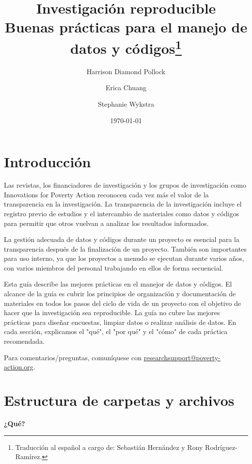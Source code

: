 \documentclass[11pt,en]{elegantpaper}
\title{Investigación reproducible \\ Buenas prácticas para el manejo de datos y códigos\footnote{Traducción al español a cargo de: Sebastián Hernández y Rony Rodríguez-Ramírez.}}
\author{Harrison Diamond Pollock \and Erica Chuang \and Stephanie Wykstra}
\date{\today}
\begin{document}
\maketitle
\tableofcontents
\newpage 
\section{Introducción}
\label{sec:intro}

Las revistas, los financiadores de investigación y los grupos de investigación como Innovations for Poverty Action reconocen cada vez más el valor de la transparencia en la investigación. La transparencia de la investigación incluye el registro previo de estudios y el intercambio de materiales como datos y códigos para permitir que otros vuelvan a analizar los resultados informados.

La gestión adecuada de datos y códigos durante un proyecto es esencial para la transparencia después de la finalización de un proyecto. También son importantes para uso interno, ya que los proyectos a menudo se ejecutan durante varios años, con varios miembros del personal trabajando en ellos de forma secuencial.

Esta guía describe las mejores prácticas en el manejor de datos y códigos. El alcance de la guía es cubrir los principios de organización y documentación de materiales en todos los pasos del ciclo de vida de un proyecto con el objetivo de hacer que la investigación sea reproducible. La guía no cubre las mejores prácticas para diseñar encuestas, limpiar datos o realizar análisis de datos. En cada sección, explicamos el "qué", el "por qué" y el "cómo" de cada práctica recomendada.

Para comentarios/preguntas, comuníquese con \href{mailto:researchsupport@poverty-action.org}{researchsupport@poverty-action.org}.

\newpage 
\section{Estructura de carpetas y archivos}
\label{sec:estructura}
\noindent
\textbf{¿Qué?}
\end{document}
